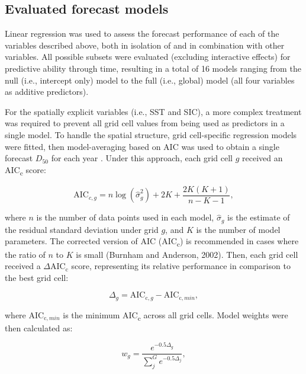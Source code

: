 \documentclass[12pt,]{book}
\theoremstyle{definition}
\theoremstyle{definition}
\theoremstyle{definition}
\theoremstyle{remark}
\begin{document}
\subsection{Evaluated forecast models}\label{rtf-models}

\noindent
Linear regression was used to assess the forecast performance of each of
the variables described above, both in isolation of and in combination
with other variables. All possible subsets were evaluated (excluding
interactive effects) for predictive ability through time, resulting in a
total of 16 models ranging from the null (i.e., intercept only) model to
the full (i.e., global) model (all four variables as additive
predictors).

For the spatially explicit variables (i.e., SST and SIC), a more complex
treatment was required to prevent all grid cell values from being used
as predictors in a single model. To handle the spatial structure, grid
cell-specific regression models were fitted, then model-averaging based
on AIC was used to obtain a single forecast \(D_{50}\) for each year
\citep{burnham-anderson-2002}. Under this approach, each grid cell \(g\)
received an AIC\textsubscript{c} score:

\begin{equation}
  \text{AIC}_{c,g}=n \log{\left(\hat{\sigma}_g^2\right) + 2K + \frac{2K(K+1)}{n-K-1}},
  \label{eq:aicc}
\end{equation}

\noindent
where \(n\) is the number of data points used in each model,
\(\hat{\sigma}_g\) is the estimate of the residual standard deviation
under grid \(g\), and \(K\) is the number of model parameters. The
corrected version of AIC (AIC\textsubscript{c}) is recommended in cases
where the ratio of \(n\) to \(K\) is small (Burnham and Anderson, 2002).
Then, each grid cell received a \(\Delta\text{AIC}_\text{c}\) score,
representing its relative performance in comparison to the best grid
cell:

\begin{equation}
  \Delta_g=\text{AIC}_{\text{c},g}-\text{AIC}_{\text{c},min},
  \label{eq:delta-aicc}
\end{equation}

\noindent
where \(\text{AIC}_{\text{c},min}\) is the minimum AIC\textsubscript{c}
across all grid cells. Model weights were then calculated as:

\begin{equation}
  w_g=\frac{e^{-0.5\Delta_g}}{\sum_j^G e^{-0.5\Delta_j}},
\label{eq:aicc-weights}
\end{equation}
\end{document}
